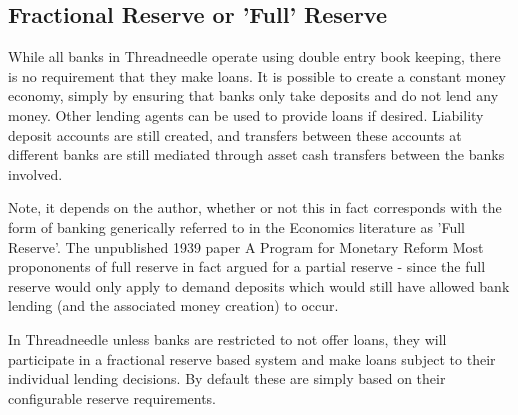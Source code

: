 \documentclass[10pt,oneside,openright, a4paper]{memoir}
\begin{document}
\subsection{Fractional Reserve or 'Full' Reserve}
While all banks in Threadneedle operate using double entry book keeping,
there is no requirement that they make loans. It is
possible to create a constant money economy, simply by ensuring that
banks only take deposits and do not 
lend any money. Other lending agents can be used to provide
loans if desired. Liability deposit accounts are still created, and
transfers between these accounts at different banks are still
mediated through asset cash transfers between the banks involved. 
\par
Note, it depends on the author, whether or not this in 
fact corresponds with the form of banking generically referred
to in the Economics literature as 'Full Reserve'. The unpublished
1939 paper A Program for Monetary Reform\cite{fisher.1939}
Most propononents of full reserve in fact argued for a partial
reserve - since the full reserve would only apply to demand deposits
which would still have allowed bank lending (and the associated money creation) 
to occur.
\par
In Threadneedle
unless banks are restricted to not offer loans, they will 
participate in a fractional reserve based system and make loans
subject to their individual lending decisions. By default
these are simply based on their configurable reserve requirements.
\end{document}
